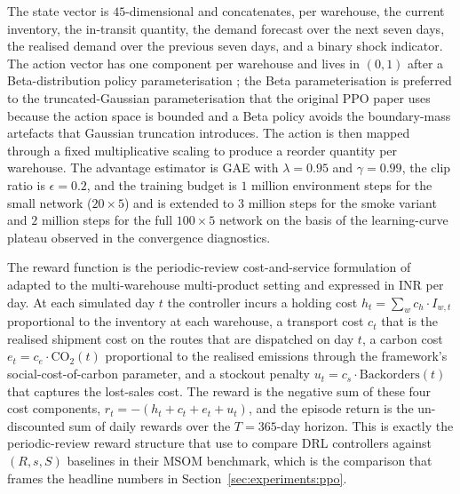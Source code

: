 \documentclass[review,preprint,authoryear,12pt]{elsarticle}
\begin{document}
The state vector is $45$-dimensional and concatenates, per warehouse,
the current inventory, the in-transit quantity, the demand forecast
over the next seven days, the realised demand over the previous seven
days, and a binary shock indicator. The action vector has one
component per warehouse and lives in $(0, 1)$ after a Beta-distribution
policy parameterisation \citep{chou2017beta}; the Beta parameterisation
is preferred to the truncated-Gaussian parameterisation that the
original PPO paper uses because the action space is bounded and a
Beta policy avoids the boundary-mass artefacts that Gaussian
truncation introduces. The action is then mapped through a fixed
multiplicative scaling to produce a reorder quantity per warehouse.
The advantage estimator is GAE \citep{schulman2017ppo} with
$\lambda = 0.95$ and $\gamma = 0.99$, the clip ratio is
$\epsilon = 0.2$, and the training budget is $1$ million environment
steps for the small network ($20\times 5$) and is extended to $3$
million steps for the smoke variant and $2$ million steps for the
full $100\times 5$ network on the basis of the learning-curve plateau
observed in the convergence diagnostics.

The reward function is the periodic-review cost-and-service formulation
of \citet{vanvuchelen2024continuous_action} adapted to the
multi-warehouse multi-product setting and expressed in INR per day.
At each simulated day $t$ the controller incurs a holding cost
$h_t = \sum_w c_h \cdot I_{w,t}$ proportional to the inventory at
each warehouse, a transport cost $c_t$ that is the realised shipment
cost on the routes that are dispatched on day $t$, a carbon cost
$e_t = c_e \cdot \mathrm{CO}_2(t)$ proportional to the realised
emissions through the framework's social-cost-of-carbon parameter,
and a stockout penalty $u_t = c_s \cdot \mathrm{Backorders}(t)$ that
captures the lost-sales cost. The reward is the negative sum of
these four cost components, $r_t = -(h_t + c_t + e_t + u_t)$, and
the episode return is the un-discounted sum of daily rewards over
the $T = 365$-day horizon. This is exactly the periodic-review reward
structure that \citet{gijsbrechts2022drl_inventory} use to compare
DRL controllers against $(R, s, S)$ baselines in their MSOM benchmark,
which is the comparison that frames the headline numbers in
Section~\ref{sec:experiments:ppo}.
\end{document}
